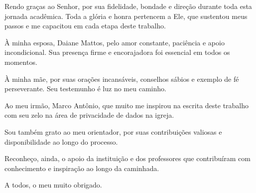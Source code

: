 \begin{agradecimentos}
Rendo graças ao Senhor, por sua fidelidade, bondade e direção durante toda esta jornada acadêmica. Toda a glória e honra pertencem a Ele, que sustentou meus passos e me capacitou em cada etapa deste trabalho.

À minha esposa, Daiane Mattos, pelo amor constante, paciência e apoio incondicional. Sua presença firme e encorajadora foi essencial em todos os momentos.

À minha mãe, por suas orações incansáveis, conselhos sábios e exemplo de fé perseverante. Seu testemunho é luz no meu caminho.

Ao meu irmão, Marco Antônio, que muito me inspirou na escrita deste trabalho com seu zelo na área de privacidade de dados na igreja.

Sou também grato ao meu orientador, por suas contribuições valiosas e disponibilidade ao longo do processo.

Reconheço, ainda, o apoio da instituição e dos professores que contribuíram com conhecimento e inspiração ao longo da caminhada.

A todos, o meu muito obrigado.
\end{agradecimentos}